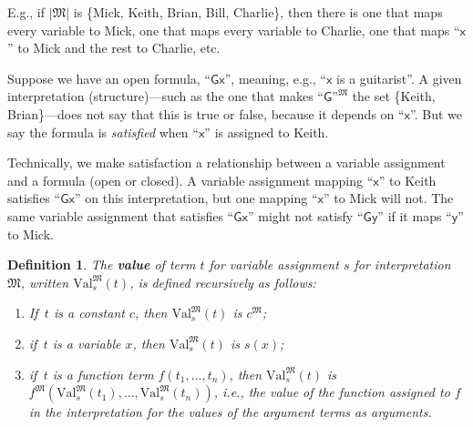 \documentclass[12pt]{report}
\theoremstyle{nonumberplain}
\newtheorem{definition}{Definition}
\newcommand{\M}{\mathfrak{M}}
\newcommand{\Val}{\mathrm{Val}}
\newcommand{\ValMs}{\Val^{\M}_{s}}
\newcommand{\defm}[1]{\textbf{#1}\index{#1}}
\renewcommand{\o}[1]{\mathsf{#1}}
\begin{document}
E.g., if $|\M|$ is \{Mick, Keith, Brian, Bill, Charlie\}, then there is one that maps every variable to Mick, one that maps every variable to Charlie, one that maps ``$\o{x}$'' to Mick and the rest to Charlie, etc.

Suppose we have an open formula, ``$\o{Gx}$'', meaning, e.g., ``$\o{x}$ is a guitarist''. A given interpretation (structure)---such as the one that makes $\text{``}\o{G}\text{''}^{\M}$ the set \{Keith, Brian\}---does not say that this is true or false, because it depends on ``$\o{x}$''. But we say the formula is \emph{satisfied} when ``$\o{x}$'' is assigned to Keith.

Technically, we make satisfaction a relationship between a variable assignment and a formula (open or closed). A variable assignment mapping ``$\o{x}$'' to Keith satisfies ``$\o{Gx}$'' on this interpretation, but one mapping ``$\o{x}$'' to Mick will not. The same variable assignment that satisfies ``$\o{Gx}$'' might not satisfy ``$\o{Gy}$'' if it maps ``$\o{y}$'' to Mick.

\begin{definition}
The \defm{value} of term $t$ for variable assignment $s$ for interpretation $\M$, written $\ValMs(t)$, is defined recursively as follows:
\begin{enumerate}
\item If \,$t$ is a constant $c$, then $\ValMs(t)$ is $c^{\M}$;
\item if \,$t$ is a variable $x$, then $\ValMs(t)$ is $s(x)$;
\item if \,$t$ is a function term $f(t_1, \dotsc, t_n)$, then $\ValMs(t)$ is $f^{\M}(\ValMs(t_1), \dotsc, \ValMs(t_n))$, i.e., the value of the function assigned to $f$ in the interpretation for the values of the argument terms as arguments.
\end{enumerate}
\end{definition}
\end{document}
